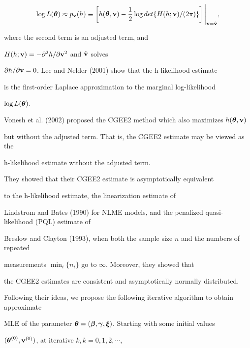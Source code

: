 \documentclass[12pt]{article}
\newcommand{\btheta}{\mbox{\boldmath $\theta$}}
\newcommand{\bgamma}{\mbox{\boldmath $\gamma$}}
\newcommand{\bbeta}{\mbox{\boldmath $\beta$}}
\newcommand{\bxi}{\mbox{\boldmath $\xi$}}
\begin{document}
  $$   \log L(\btheta)  \approx p_{\bf v}(h)

         \equiv \left[h(\btheta, {\bf v})

         - \frac{1}{2}\log det\{H(h; {\bf v})/(2\pi)\}\right] \Bigg |_{{\bf v}=\hat{\bf v}},   $$

where the second term is an adjusted term, and 

$H(h; {\bf v}) = - \partial^2 h/\partial{\bf v}^2$ and $\hat{\bf v}$ solves

$\partial h/\partial{\bf v}=0$. Lee and Nelder (2001) show that the h-likelihood estimate 

is the first-order Laplace approximation to the marginal log-likelihood 

$\log L(\btheta)$.  





     Vonesh et al. (2002) proposed the CGEE2 method which also maximizes $h(\btheta, {\bf v})$

but without the adjusted term. That is, the CGEE2 estimate may be viewed as the 

h-likelihood estimate without the adjusted term. 

They showed that their CGEE2 estimate is asymptotically equivalent 

to the h-likelihood estimate, the linearization estimate of 

Lindstrom and Bates (1990) for NLME models, and the penalized quasi-likelihood (PQL) estimate of 

Breslow and Clayton (1993), when both the sample size $n$ and the numbers of repeated 

measurements $\min_i\{n_i\}$ go to $\infty$. Moreover, they showed that 

the CGEE2 estimates are consistent and asymptotically normally distributed. 

Following their ideas, we propose the following iterative algorithm to obtain approximate 

MLE of the parameter $\btheta = (\bbeta, \bgamma, \bxi)$. Starting with some initial values 

$(\btheta^{(0)}, {\bf v}^{(0)})$, at iterative $k, k = 0,1,2,\cdots,$ 
\end{document}
